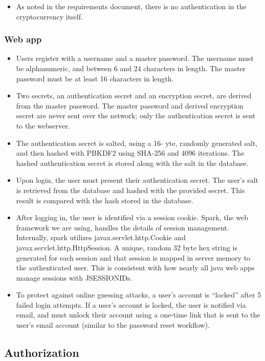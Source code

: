 \documentclass[12pt]{article}
\begin{document}
\begin{itemize}
	\item As noted in the requirements document, there is no authentication in the cryptocurrency itself.
\end{itemize}

\subsubsection*{Web app}

\begin{itemize}
	\item Users register with a username and a master password. The username must be alphanumeric, and between 6 and 24 characters in length.
	The master password must be at least 16 characters in length.
	\item Two secrets, an authentication secret and an encryption secret, are derived from the master password.
	The master password and derived encryption secret are never sent over the network; only the authentication secret is sent to the webserver.
	\item The authentication secret is salted, using a 16- yte, randomly generated salt, and then hashed with PBKDF2 using SHA-256 and 4096 iterations.
	The hashed authentication secret is stored along with the salt in the database.
	\item Upon login, the user must present their authentication secret. The user's salt is retrieved from the database and hashed with the provided secret.
	This result is compared with the hash stored in the database.
	\item After logging in, the user is identified via a session cookie.
	Spark, the web framework we are using, handles the details of session management. Internally, spark utilizes javax.servlet.http.Cookie and javax.servlet.http.HttpSession.
	A unique, random 32 byte hex string is generated for each session and that session is mapped in server memory to the authenticated user. This is consistent with how nearly all
	java web apps manage sessions with JSESSIONIDs.
	\item To protect against online guessing attacks, a user's account is ``locked'' after 5 failed login attempts.
	If a user's account is locked, the user is notified via email, and must unlock their account using a one-time link that is sent to the user's email account (similar to the password reset workflow).
\end{itemize}

\subsection{Authorization}
\end{document}

